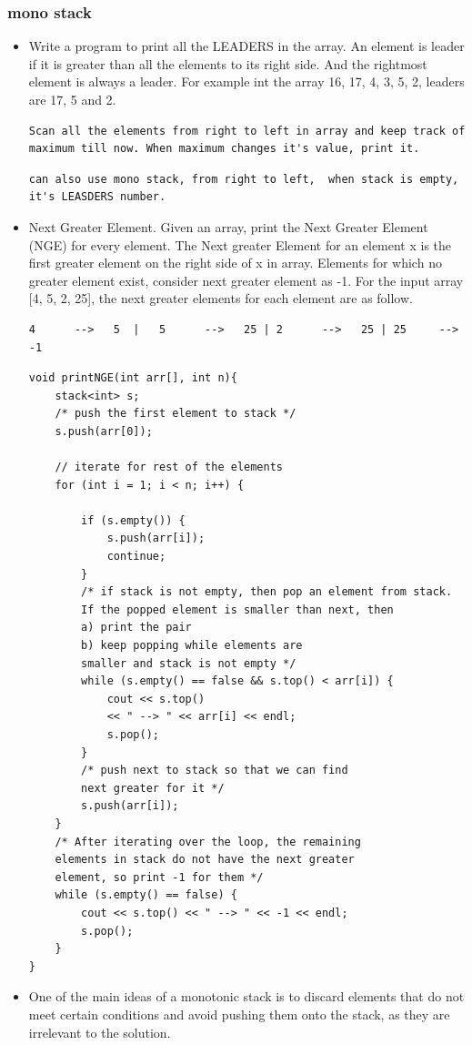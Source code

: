 \documentclass[a4paper,11pt,twoside]{book}
\begin{document}
\subsubsection{mono stack}
\begin{itemize}
	
	\item  Write a program to print all the LEADERS in the array. An element is leader if it is greater than all the elements to its right side. And the rightmost element is always a leader. For example int the array {16, 17, 4, 3, 5, 2}, leaders are 17, 5 and 2.  
	
\begin{lstlisting}[breaklines]
Scan all the elements from right to left in array and keep track of maximum till now. When maximum changes it's value, print it.
\end{lstlisting}	

\begin{lstlisting}[breaklines]
can also use mono stack, from right to left,  when stack is empty, it's LEASDERS number. 
\end{lstlisting}	

	
	\item Next Greater Element.  Given an array, print the Next Greater Element (NGE) for every element. The Next greater Element for an element x is the first greater element on the right side of x in array. Elements for which no greater element exist, consider next greater element as -1. For the input array [4, 5, 2, 25], the next greater elements for
	each element are as follow.
\begin{verbatim}
4      -->   5  |  	5      -->   25 | 2      -->   25 | 25     -->   -1
\end{verbatim}

\begin{lstlisting}[breaklines]
void printNGE(int arr[], int n){
	stack<int> s;	
	/* push the first element to stack */
	s.push(arr[0]);

	// iterate for rest of the elements
	for (int i = 1; i < n; i++) {
		
		if (s.empty()) {
			s.push(arr[i]);
			continue;
		}		
		/* if stack is not empty, then pop an element from stack.
		If the popped element is smaller than next, then
		a) print the pair
		b) keep popping while elements are
		smaller and stack is not empty */
		while (s.empty() == false && s.top() < arr[i]) {
			cout << s.top() 
			<< " --> " << arr[i] << endl;
			s.pop();
		}	
		/* push next to stack so that we can find
		next greater for it */
		s.push(arr[i]);
	}	
	/* After iterating over the loop, the remaining
	elements in stack do not have the next greater
	element, so print -1 for them */
	while (s.empty() == false) {
		cout << s.top() << " --> " << -1 << endl;
		s.pop();
	}
}
\end{lstlisting}	

	\item One of the main ideas of a monotonic stack is to discard elements that do not meet certain conditions and avoid pushing them onto the stack, as they are irrelevant to the solution.

\end{itemize}	
\end{document}
